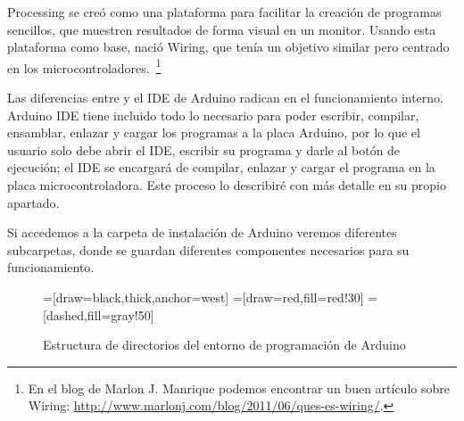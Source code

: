 Processing se creó como una plataforma para facilitar la creación de programas sencillos, que muestren resultados de forma visual en un monitor. Usando esta plataforma como base, nació Wiring, que tenía un objetivo similar pero centrado en los microcontroladores.~\footnote{En el blog de Marlon J. Manrique podemos encontrar un buen artículo sobre Wiring: \url{http://www.marlonj.com/blog/2011/06/ques-es-wiring/}.}

Las diferencias entre  y el IDE de Arduino radican en el funcionamiento interno. Arduino IDE tiene incluido todo lo necesario para poder escribir, compilar, ensamblar, enlazar y cargar los programas a la placa Arduino, por lo que el usuario solo debe abrir el IDE, escribir su programa y darle al botón de ejecución; el IDE se encargará de compilar, enlazar y cargar el programa en la placa microcontroladora. Este proceso lo describiré con más detalle en su propio apartado.

Si accedemos a la carpeta de instalación de Arduino veremos diferentes subcarpetas, donde se guardan diferentes componentes necesarios para su funcionamiento.
\begin{figure}[H]
\begin{center}
=[draw=black,thick,anchor=west]
=[draw=red,fill=red!30]
=[dashed,fill=gray!50]
\end{center}
\caption{Estructura de directorios del entorno de programación de Arduino}
\label{arduino_carpetas}
\end{figure}

